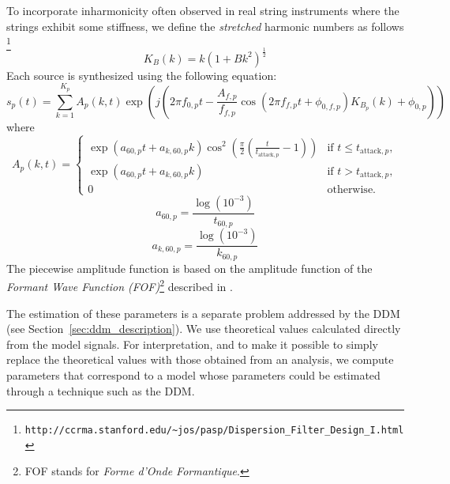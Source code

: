 To incorporate inharmonicity often observed in real string instruments where the
strings exhibit some stiffness, we define the \textit{stretched} harmonic numbers
as follows
\cite{paspweb2010}\footnote{
\texttt{http://ccrma.stanford.edu/\~{}jos/pasp/Dispersion\_Filter\_Design\_I.html}}
\begin{equation}
    K_{B}(k) = k (1+Bk^{2})^{\frac{1}{2}}
\end{equation}
Each source is synthesized using the following equation:
\begin{equation}
    s_{p}(t) = \sum_{k=1}^{K_{p}} A_{p}(k,t) \exp(j(2\pi
    f_{0,p}t - \frac{A_{f,p}}{f_{f,p}} \cos(2\pi f_{f,p} t +
    \phi_{0,f,p}) K_{B_{p}}(k) + \phi_{0,p}))
\end{equation}
where
\begin{equation}
    A_{p}(k,t) = 
    \begin{cases}
        \exp(a_{60,p} t + a_{k,60,p}k) \cos^{2}
        (\frac{\pi}{2}(\frac{t}{t_{\text{attack},p}} - 1)) & \text{if } t \leq
        t_{\text{attack},p},\\
        \exp(a_{60,p} t + a_{k,60,p}k) & \text{if } t > t_{\text{attack},p},\\
        0 & \text{otherwise}.
    \end{cases}
\end{equation}
\begin{equation}
    a_{60,p} = \frac{\log(10^{-3})}{t_{60,p}}
\end{equation}
\begin{equation}
    a_{k,60,p} = \frac{\log(10^{-3})}{k_{60,p}} 
\end{equation}
The piecewise amplitude function is based on the amplitude function of the
\textit{Formant Wave Function (FOF)}\footnote{FOF stands for \textit{Forme
d'Onde Formantique}.} described in \cite[p.~19]{rodet1984chant}.

The estimation of these parameters is a separate problem addressed by the
DDM (see Section~\ref{sec:ddm_description}). We use theoretical values calculated
directly from the model signals. For interpretation, and to make it possible to
simply replace the theoretical values with those obtained from an analysis, we
compute parameters that correspond to a model whose parameters could be
estimated through a technique such as the DDM.

